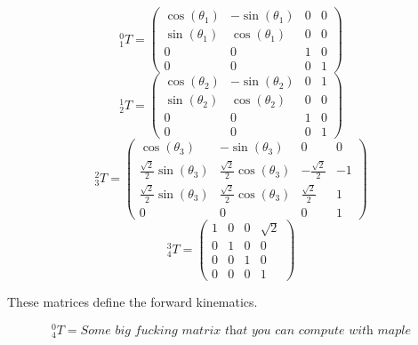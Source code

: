\documentclass[10pt,a4paper]{article}
\begin{document}
\begin{equation*}
  {}_{1}^{0}T = \begin{pmatrix}
    \cos(\theta_{1}) & -\sin(\theta_{1}) & 0 & 0\\
    \sin(\theta_{1}) & \cos(\theta_{1}) & 0 & 0\\
    0 & 0 & 1 & 0\\
    0 & 0 & 0 & 1
  \end{pmatrix}
\end{equation*}
\begin{equation*}
  {}_{2}^{1}T = \begin{pmatrix}
    \cos(\theta_{2}) & -\sin(\theta_{2}) & 0 & 1\\
    \sin(\theta_{2}) & \cos(\theta_{2}) & 0 & 0\\
    0 & 0 & 1 & 0\\
    0 & 0 & 0 & 1
  \end{pmatrix}
\end{equation*}
\begin{equation*}
  {}_{3}^{2}T = \begin{pmatrix}
    \cos(\theta_{3}) & -\sin(\theta_{3}) & 0 & 0\\
    \frac{\sqrt{2}}{2}\sin(\theta_{3}) & \frac{\sqrt{2}}{2}\cos(\theta_{3}) & -\frac{\sqrt{2}}{2} & -1\\
    \frac{\sqrt{2}}{2}\sin(\theta_{3}) & \frac{\sqrt{2}}{2}\cos(\theta_{3}) & \frac{\sqrt{2}}{2} & 1\\
    0 & 0 & 0 & 1
  \end{pmatrix}
\end{equation*}
\begin{equation*}
  {}_{4}^{3}T = \begin{pmatrix}
    1 & 0 & 0 & \sqrt{2}\\
    0 & 1 & 0 & 0\\
    0 & 0 & 1 & 0\\
    0 & 0 & 0 & 1
  \end{pmatrix}
\end{equation*}

These matrices define the forward kinematics.

\begin{equation*}
  {}_{4}^{0}T = \textit{Some big fucking matrix that you can compute with maple}
\end{equation*}
\end{document}
